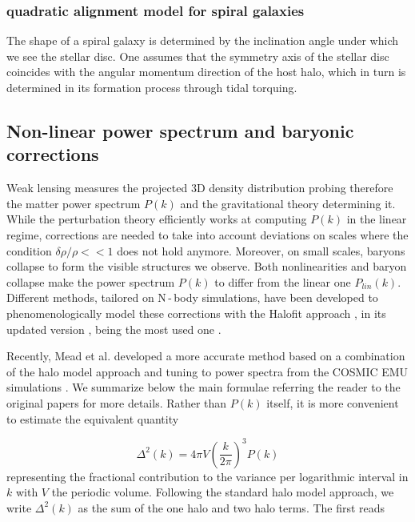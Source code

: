 \subsubsection{quadratic alignment model for spiral galaxies}
The shape of a spiral galaxy is determined by the inclination angle under which we see the stellar disc. One assumes that the symmetry axis of the stellar disc coincides with the angular momentum direction of the host halo, which in turn is determined in its formation process through tidal torquing.



\subsection{Non-linear power spectrum and baryonic corrections}

Weak lensing measures the projected 3D density distribution probing therefore the matter power spectrum $P(k)$ and the gravitational theory determining it. While the perturbation theory efficiently works at computing $P(k)$ in the linear regime, corrections are needed to take into account deviations on scales where the condition $\delta \rho/\rho << 1$ does not hold anymore. Moreover, on small scales, baryons collapse to form the visible structures we observe. Both nonlinearities and baryon collapse make the power spectrum $P(k)$ to differ from the linear one $P_{lin}(k)$. Different methods, tailored on N\,-\,body simulations, have been developed to phenomenologically model these corrections with the Halofit approach \cite{HaloFit}, in its updated version \cite{Taka,Bird_Viel_Haehnelt_2012}, being the most used one .  

Recently, Mead et al. \cite{Mead15,Mead16} developed a more accurate method based on a combination of the halo model approach \cite{Sel00,PS00,CS02} and tuning to power spectra from the COSMIC EMU simulations \cite{Heit10,Heit14}. We summarize below the main formulae referring the reader to the original papers for more details. Rather than $P(k)$ itself, it is more convenient to estimate the equivalent quantity

\begin{displaymath}
\Delta^2(k) = 4 \pi V \left ( \frac{k}{2 \pi} \right )^3 P(k)
\end{displaymath}
representing the fractional contribution to the variance per logarithmic interval in $k$ with $V$ the periodic volume. Following the standard halo model approach, we write $\Delta^2(k)$ as the sum of the one halo and two halo terms. The first reads

